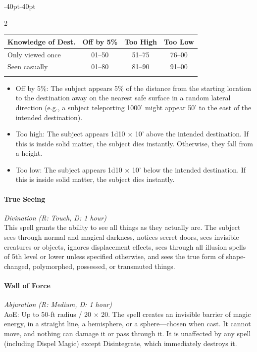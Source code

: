 \documentclass{book}
\providecommand{\tightlist}{%
\setlength{\itemsep}{0pt}\setlength{\parskip}{0pt}}
\begin{document}
\begin{adjustwidth}{-40pt}{-40pt}
\begin{multicols}{2}
\begin{table}[H]
	\centering
	\begin{tabular}[]{@{}lccc@{}}
		\toprule\noalign{}
			Knowledge of Dest. & Off by 5\% & Too High & Too Low \\
		\midrule\noalign{}
			Only viewed once & 01--50 & 51--75 & 76--00 \\
			Seen casually & 01--80 & 81--90 & 91--00 \\
		\bottomrule\noalign{}
	\end{tabular}
\end{table}

\begin{itemize}
	\tightlist
	\item
	Off by 5\%: The subject appears 5\% of the distance from the starting
	location to the destination away on the nearest safe surface in a
	random lateral direction (e.g., a subject teleporting 1000' might
	appear 50' to the east of the intended destination).
	\item
	Too high: The subject appears 1d10 × 10' above the intended
	destination. If this is inside solid matter, the subject dies
	instantly. Otherwise, they fall from a height.
	\item
	Too low: The subject appears 1d10 × 10' below the intended
	destination. If this is inside solid matter, the subject dies
	instantly.
\end{itemize}

\paragraph{True Seeing}\label{true-seeing}

\emph{Divination (R: Touch, D: 1 hour)}\\
This spell grants the ability to see all things as they actually are.
The subject sees through normal and magical darkness, notices secret
doors, sees invisible creatures or objects, ignores displacement
effects, sees through all illusion spells of 5th level or lower unless
specified otherwise, and sees the true form of shape-changed,
polymorphed, possessed, or transmuted things.

\paragraph{Wall of Force}\label{wall-of-force}

\emph{Abjuration (R: Medium, D: 1 hour)}\\
AoE: Up to 50-ft radius / 20 × 20. The spell creates an invisible
barrier of magic energy, in a straight line, a hemisphere, or a
sphere---chosen when cast. It cannot move, and nothing can damage it or
pass through it. It is unaffected by any spell (including Dispel Magic)
except Disintegrate, which immediately destroys it.


\end{multicols}
\end{adjustwidth}
\end{document}
